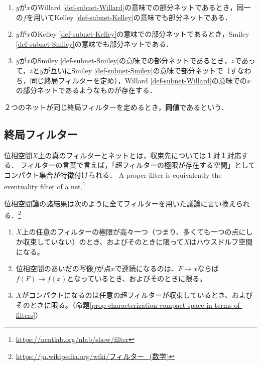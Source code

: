 \documentclass[uplatex,dvipdfmx]{jsreport}
\begin{document}
\begin{theorem}[Schechter, 1996]\mbox{}
    \begin{enumerate}
        \item $y$が$x$のWillard \ref{def-subnet-Willard}の意味での部分ネットであるとき，同一の$f$を用いてKelley \ref{def-subnet-Kelley}の意味でも部分ネットである．
        \item $y$が$x$のKelley \ref{def-subnet-Kelley}の意味での部分ネットであるとき，Smiley \ref{def-subnet-Smiley}の意味でも部分ネットである．
        \item $y$が$x$のSmiley \ref{def-subnet-Smiley}の意味での部分ネットであるとき，$z$であって，$z$と$y$が互いにSmiley \ref{def-subnet-Smiley}の意味で部分ネットで（すなわち，同じ終局フィルターを定め），Willard \ref{def-subnet-Willard}の意味での$x$の部分ネットであるようなものが存在する．
    \end{enumerate}
\end{theorem}

\begin{definition}
    ２つのネットが同じ終局フィルターを定めるとき，\textbf{同値}であるという．
\end{definition}

\subsection{終局フィルター}

\begin{tcolorbox}[colframe=ForestGreen, colback=ForestGreen!10!white,breakable,colbacktitle=ForestGreen!40!white,coltitle=black,fonttitle=\bfseries\sffamily,
title=ネットの定めるフィルター]
    位相空間$X$上の真のフィルターとネットとは，収束先については１対１対応する．
    フィルターの言葉で言えば，「超フィルターの極限が存在する空間」としてコンパクト集合が特徴付けられる．
    A proper filter is equivalently the eventuality filter of a net.\footnote{\url{https://ncatlab.org/nlab/show/filter}}

    位相空間論の諸結果は次のように全てフィルターを用いた議論に言い換えられる．\footnote{\url{https://ja.wikipedia.org/wiki/フィルター_(数学)}}
    \begin{enumerate}
        \item $X$上の任意のフィルターの極限が高々一つ（つまり、多くても一つの点にしか収束していない）のとき、およびそのときに限って$ X $はハウスドルフ空間になる。
        \item 位相空間のあいだの写像$ f $が点$ x $で連続になるのは、$F \to x $ならば$ f(F) \to f(x) $となっているとき、およびそのときに限る。
        \item $X $がコンパクトになるのは任意の超フィルターが収束しているとき、およびそのときに限る。（命題\ref{prop-characterization-compact-space-in-terms-of-filters}）
    \end{enumerate}
\end{tcolorbox}
\end{document}
